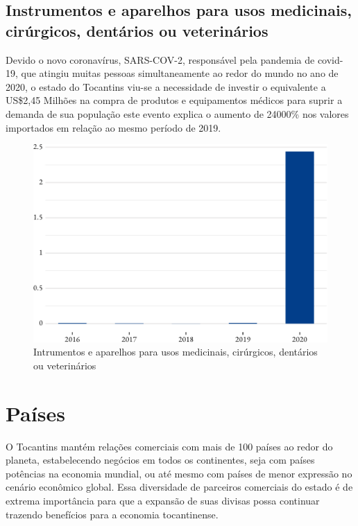 \subsection{Instrumentos e aparelhos para usos medicinais, cirúrgicos, dentários ou veterinários}
\par Devido o novo coronavírus, SARS-COV-2, responsável pela pandemia de covid-19, que atingiu muitas pessoas simultaneamente ao redor do mundo no ano de 2020, o estado do Tocantins viu-se a necessidade de investir o equivalente a US\$2,45 Milhões na compra de produtos e equipamentos médicos para suprir a demanda de sua população este evento explica o aumento de 24000\% nos valores importados em relação ao mesmo período de 2019.

\begin{figure}[h] 
	\caption{Intrumentos e aparelhos para usos medicinais, cirúrgicos, dentários ou veterinários}
	\includegraphics{fig/inst1-1.pdf}
\end{figure}

\section{Países}
\par O Tocantins mantém relações comerciais com mais de 100 países ao redor do planeta, estabelecendo negócios em todos os continentes, seja com países potências na economia mundial, ou até mesmo com países de menor expressão no cenário econômico global. Essa diversidade de parceiros comerciais do estado é de extrema importância para que a expansão de suas divisas possa continuar trazendo benefícios para a economia tocantinense.

